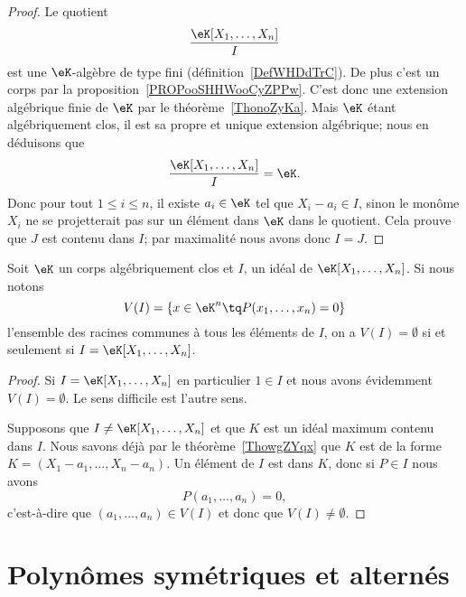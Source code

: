 \begin{proof}
	Le quotient
	\begin{equation}
		\frac{ \eK[X_1,\ldots, X_n] }{ I }
	\end{equation}
	est une \( \eK\)-algèbre de type fini (définition~\ref{DefWHDdTrC}). De plus c'est un corps par la proposition~\ref{PROPooSHHWooCyZPPw}. C'est donc une extension algébrique finie de \( \eK\) par le théorème~\ref{ThonoZyKa}. Mais \( \eK\) étant algébriquement clos, il est sa propre et unique extension algébrique; nous en déduisons que
	\begin{equation}
		\frac{ \eK[X_1,\ldots, X_n] }{ I }=\eK.
	\end{equation}
	Donc pour tout \( 1\leq i\leq n\), il existe \( a_i\in \eK\) tel que \( X_i-a_i\in I\), sinon le monôme \( X_i\) ne se projetterait pas sur un élément dans \( \eK\) dans le quotient. Cela prouve que \( J\) est contenu dans \( I\); par maximalité nous avons donc \( I=J\).
\end{proof}

\begin{corollary}
	Soit \( \eK\) un corps algébriquement clos et \( I\), un idéal de \( \eK[X_1,\ldots, X_n]\). Si nous notons
	\begin{equation}
		V(I)=\{ x\in \eK^n\tq P(x_1,\ldots, x_n)=0 \}
	\end{equation}
	l'ensemble des racines communes à tous les éléments de \( I\), on a \( V(I)=\emptyset\) si et seulement si \( I=\eK[X_1,\ldots, X_n]\).
\end{corollary}

\begin{proof}
	Si \( I=\eK[X_1,\ldots, X_n]\) en particulier \( 1\in I\) et nous avons évidemment \( V(I)=\emptyset\). Le sens difficile est l'autre sens.

	Supposons que \( I\neq \eK[X_1,\ldots, X_n]\) et que \( K\) est un idéal maximum contenu dans \( I\). Nous savons déjà par le théorème~\ref{ThowgZYqx} que \( K\) est de la forme \( K=(X_1-a_1,\ldots, X_n-a_n)\). Un élément de \( I\) est dans \( K\), donc si \( P\in I\) nous avons
	\begin{equation}
		P(a_1,\ldots, a_n)=0,
	\end{equation}
	c'est-à-dire que \( (a_1,\ldots, a_n)\in V(I)\) et donc que \( V(I)\neq \emptyset \).
\end{proof}

\section{Polynômes symétriques et alternés}

